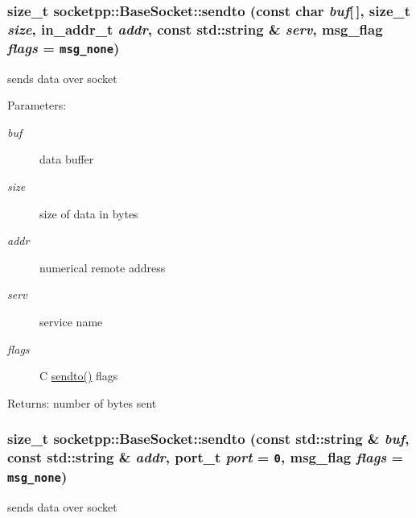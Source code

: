\begin{CompactItemize}
{\subsubsection[{sendto}]{\setlength{\rightskip}{0pt plus 5cm}size\_\-t socketpp::BaseSocket::sendto (const char {\em buf}\mbox{[}$\,$\mbox{]}, \/  size\_\-t {\em size}, \/  in\_\-addr\_\-t {\em addr}, \/  const std::string \& {\em serv}, \/  msg\_\-flag {\em flags} = {\tt msg\_\-none})}}
\label{classsocketpp_1_1BaseSocket_ca4c0bbe94058654d01b82d517c9c590}


sends data over socket 

\begin{Desc}
\item[Parameters:]
\begin{description}
\item[{\em buf}]data buffer \item[{\em size}]size of data in bytes \item[{\em addr}]numerical remote address \item[{\em serv}]service name \item[{\em flags}]C \hyperlink{classsocketpp_1_1BaseSocket_d6df36281c6fce81e5c4c493ac91a6f8}{sendto()} flags \end{description}
\end{Desc}
\begin{Desc}
\item[Returns:]number of bytes sent \end{Desc}
\hypertarget{classsocketpp_1_1BaseSocket_63cabdd45f7985f6a63cf11eb2e031c5}{
\subsubsection[{sendto}]{\setlength{\rightskip}{0pt plus 5cm}size\_\-t socketpp::BaseSocket::sendto (const std::string \& {\em buf}, \/  const std::string \& {\em addr}, \/  port\_\-t {\em port} = {\tt 0}, \/  msg\_\-flag {\em flags} = {\tt msg\_\-none})}}
\label{classsocketpp_1_1BaseSocket_63cabdd45f7985f6a63cf11eb2e031c5}


sends data over socket 


\end{CompactItemize}
